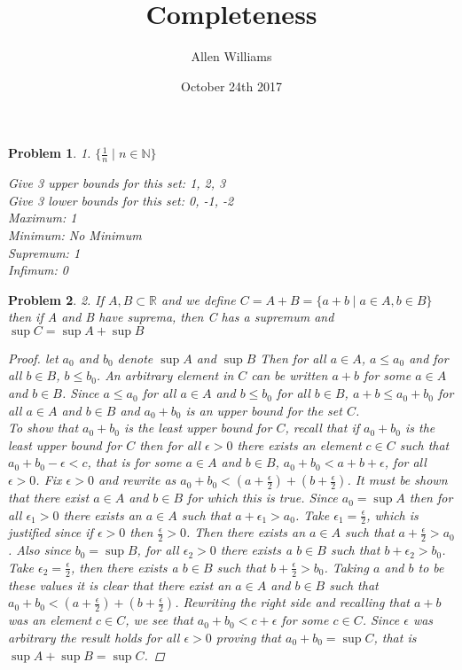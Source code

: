 \documentclass{article}
\title{Completeness}
\author{Allen Williams }
\date{October 24th 2017}
\newtheorem*{Problem}{Problem}
\begin{document}
\maketitle

\begin{Problem}
    1. $\{\frac{1}{n}\mid n\in\mathbb{N} \}$ \\
    \begin{addmargin}[2em]{}
    Give 3 upper bounds for this set: 1, 2, 3 \\
    Give 3 lower bounds for this set: 0, -1, -2 \\
    Maximum: 1 \\
    Minimum: No Minimum \\
    Supremum: 1 \\
    Infimum: 0 \\
    \end{addmargin}
\end{Problem}

\begin{Problem}
    2. If $A,B \subset \mathbb{R}$ and we define $C=A+B=\{a+b\mid a\in A, b\in B \}$ then if A and B have suprema, then C has a supremum and $\sup C=\sup A+\sup B$
    \begin{proof}
        let $a_0$ and $b_0$ denote $\sup A$ and $\sup B$ Then for all $a \in A$, $a \leq a_0$ and for all $b \in B$, $b\leq b_0$.  An arbitrary element in $C$ can be written $a+b$ for some $a \in A$ and $b \in B$.  Since $a\leq a_0$ for all $a \in A$ and $b\leq b_0$ for all $b \in B$, $a+b\leq a_0+b_0$ for all $a\in A$ and $b\in B$ and $a_0 + b_0$ is an upper bound for the set $C$.\\
        To show that $a_0 + b_0$ is the least upper bound for $C$, recall that if $a_0 + b_0$ is the least upper bound for $C$ then for all $\epsilon >0$ there exists an element $c\in C$ such that $a_0+b_0-\epsilon <c$, that is for some $a\in A$ and $b\in B$, $a_0+b_0<a+b+\epsilon$, for all $\epsilon >0$.  Fix $\epsilon >0$ and rewrite as $a_0+b_0<(a+\frac{\epsilon}{2})+(b+\frac{\epsilon}{2})$.  It must be shown that there exist $a\in A$ and $b\in B$ for which this is true.  Since $a_0=\sup A$ then for all $\epsilon_1 >0$ there exists an $a\in A$ such that $a+\epsilon_1 >a_0$.  Take $\epsilon_1=\frac{\epsilon}{2}$, which is justified since if $\epsilon >0$ then $\frac{\epsilon}{2} >0$. Then there exists an $a\in A$ such that  $a+\frac{\epsilon}{2}>a_0$.  Also since $b_0=\sup B$, for all $\epsilon_2 >0$ there exists a $b\in B$ such that $b+\epsilon_2>b_0$.  Take $\epsilon_2=\frac{\epsilon}{2}$, then there exists a $b\in B$ such that $b+\frac{\epsilon}{2}>b_0$.  Taking $a$ and $b$ to be these values it is clear that there exist an $a\in A$ and $b\in B$ such that $a_0+b_0<(a+\frac{\epsilon}{2})+(b+\frac{\epsilon}{2})$.  Rewriting the right side and recalling that $a+b$ was an element $c\in C$, we see that $a_0+b_0<c+\epsilon$ for some $c\in C$.  Since $\epsilon$ was arbitrary the result holds for all $\epsilon>0$ proving that $a_0+b_0=\sup C$, that is $\sup A+\sup B=\sup C$.
    \end{proof}
\end{Problem}
\end{document}
